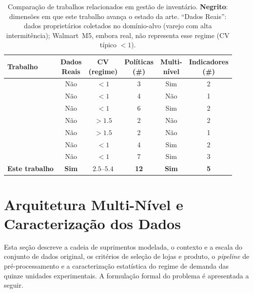 \documentclass[a4paper,11pt]{article}
\begin{document}
\begin{table}[ht]
\centering
\small
\caption{Comparação de trabalhos relacionados em gestão de inventário.
\textbf{Negrito}: dimensões em que este trabalho avança o estado da arte.
``Dados Reais'': dados proprietários coletados no domínio-alvo
(varejo com alta intermitência); Walmart~M5, embora real, não
representa esse regime (CV típico $<1$).}
\label{tab:relwork}
\begin{tabular}{@{}lccccc@{}}
\toprule
Trabalho &
\makecell[c]{Dados\\Reais} &
\makecell[c]{CV\\(regime)} &
\makecell[c]{Políticas\\(\#)} &
\makecell[c]{Multi-\\nível} &
\makecell[c]{Indicadores\\(\#)} \\
\midrule
\citealt{oroojlooyjadid:2022} & Não & $<1$         &  3 & Sim & 2 \\
\citealt{vanvuchelen:2020}    & Não & $<1$         &  4 & Não & 1 \\
\citealt{gijsbrechts:2022}    & Não & $<1$         &  6 & Sim & 2 \\
\citealt{yuna:2023}           & Não & $>1.5$     &  2 & Não & 2 \\
\citealt{erkayman:2025}       & Não & $>1.5$     &  2 & Não & 1 \\
\citealt{liu:2024}            & Não & $<1$         &  4 & Sim & 2 \\
\citealt{zabraoui:2025}       & Não & $<1$         &  7 & Sim & 3 \\
\midrule
\textbf{Este trabalho}
  & \textbf{Sim}
  & $\mathbf{2.5}$--$\mathbf{5.4}$
  & \textbf{12}
  & \textbf{Sim}
  & \textbf{5} \\
\bottomrule
\end{tabular}
\end{table}



\section{Arquitetura Multi-Nível e Caracterização dos Dados}

Esta seção descreve a cadeia de suprimentos modelada, o contexto e
a escala do conjunto de dados original, os critérios de seleção de
lojas e produto, o \textit{pipeline} de pré-processamento e a caracterização
estatística do regime de demanda das quinze unidades experimentais.
A formulação formal do problema é apresentada a seguir.
\end{document}
